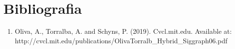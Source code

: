 \documentclass{article}
\begin{document}
\section{Bibliografia}
\begin{enumerate}
     \item  Oliva, A., Torralba, A. and Schyns, P. (2019). Cvcl.mit.edu. Available at:\\ http://cvcl.mit.edu/publications/OlivaTorralb\_Hybrid\_Siggraph06.pdf 
\end{enumerate}
   
\end{document}
